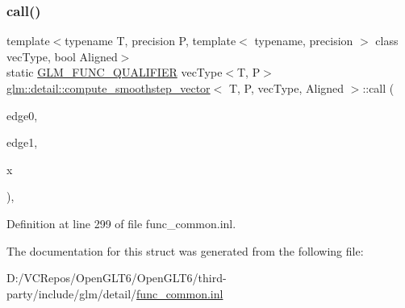 \subsubsection{\texorpdfstring{call()}{call()}}
{\footnotesize\ttfamily template$<$typename T, precision P, template$<$ typename, precision $>$ class vec\+Type, bool Aligned$>$ \\
static \mbox{\hyperlink{setup_8hpp_a33fdea6f91c5f834105f7415e2a64407}{G\+L\+M\+\_\+\+F\+U\+N\+C\+\_\+\+Q\+U\+A\+L\+I\+F\+I\+ER}} vec\+Type$<$T, P$>$ \mbox{\hyperlink{structglm_1_1detail_1_1compute__smoothstep__vector}{glm\+::detail\+::compute\+\_\+smoothstep\+\_\+vector}}$<$ T, P, vec\+Type, Aligned $>$\+::call (\begin{DoxyParamCaption}\item[{vec\+Type$<$ T, P $>$ const \&}]{edge0,  }\item[{vec\+Type$<$ T, P $>$ const \&}]{edge1,  }\item[{vec\+Type$<$ T, P $>$ const \&}]{x }\end{DoxyParamCaption})\hspace{0.3cm}{\ttfamily [inline]}, {\ttfamily [static]}}



Definition at line 299 of file func\+\_\+common.\+inl.



The documentation for this struct was generated from the following file\+:\begin{DoxyCompactItemize}
\item 
D\+:/\+V\+C\+Repos/\+Open\+G\+L\+T6/\+Open\+G\+L\+T6/third-\/party/include/glm/detail/\mbox{\hyperlink{func__common_8inl}{func\+\_\+common.\+inl}}\end{DoxyCompactItemize}
